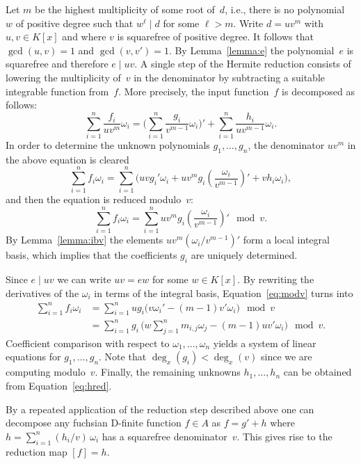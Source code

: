 \documentclass{sig-alternate}
\begin{document}
Let $m$ be the highest multiplicity of some root of~$d$, i.e., there is no
polynomial~$w$ of positive degree such that $w^\ell\mid d$ for some $\ell>m$.
Write $d=uv^m$ with $u,v\in K[x]$ and where $v$ is squarefree of positive
degree.  It follows that $\gcd(u,v)=1$ and $\gcd(v,v')=1$. By
Lemma~\ref{lemma:e} the polynomial~$e$ is squarefree and therefore $e\mid uv$.
A single step of the Hermite reduction consists of lowering the multiplicity
of~$v$ in the denominator by subtracting a suitable integrable function
from~$f$. More precisely, the input function~$f$ is decomposed as follows:
\begin{equation}\label{eq:hred}
  \sum_{i=1}^n \frac{f_i}{uv^m}\omega_i =
  \biggl(\sum_{i=1}^n\frac{g_i}{v^{m-1}}\omega_i\biggr)' +
  \sum_{i=1}^n \frac{h_i}{uv^{m-1}}\omega_i.
\end{equation}
In order to determine the unknown polynomials $g_1,\ldots,g_n$, the
denominator $uv^m$ in the above equation is cleared
\[
  \sum_{i=1}^n f_i\omega_i = \sum_{i=1}^n \biggl( uvg_i'\omega_i +
  uv^mg_i\left(\frac{\omega_i}{v^{m-1}}\right)' + vh_i\omega_i \biggr),
\]
and then the equation is reduced modulo~$v$:
\begin{equation}\label{eq:modv}
  \sum_{i=1}^n f_i\omega_i =
  \sum_{i=1}^n uv^mg_i\left(\frac{\omega_i}{v^{m-1}}\right)' \mod v.
\end{equation}
By Lemma~\ref{lemma:ibv} the elements $uv^m(\omega_i/v^{m-1})'$ form a local
integral basis, which implies that the coefficients $g_i$ are uniquely
determined.

Since $e\mid uv$ we can write $uv=ew$ for some $w\in K[x]$. By rewriting the
derivatives of the $\omega_i$ in terms of the integral basis,
Equation~\eqref{eq:modv} turns into
\begin{align*}
  \sum_{i=1}^n f_i\omega_i 
  &= \sum_{i=1}^n ug_i \bigl( v\omega_i' - (m-1)v'\omega_i \bigr) \mod v\\
  &= \sum_{i=1}^n g_i\, \biggl( w\sum_{j=1}^n m_{i,j}\omega_j - (m-1)uv'\omega_i \biggr) \mod v.
\end{align*}
Coefficient comparison with respect to $\omega_1,\ldots,\omega_n$ yields a
system of linear equations for $g_1,\ldots,g_n$. Note that $\deg_x(g_i)<\deg_x(v)$
since we are computing modulo~$v$. Finally, the remaining unknowns
$h_1,\ldots,h_n$ can be obtained from Equation~\eqref{eq:hred}.

By a repeated application of the reduction step described above
one can decompose any fuchsian D-finite function $f\in A$ as
$f=g'+h$ where $h=\sum_{i=1}^n (h_i/v)\,\omega_i$ has a squarefree
denominator~$v$. This gives rise to the reduction map $[f]=h$.
\end{document}
